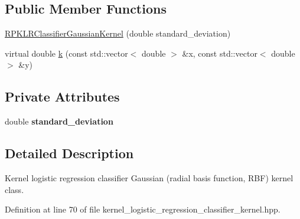 \subsection*{\-Public \-Member \-Functions}
\begin{DoxyCompactItemize}
\item 
\hyperlink{class_r_p_k_l_r_classifier_gaussian_kernel_aa2a4bd3a68b3a1ed6f53d56876891006}{\-R\-P\-K\-L\-R\-Classifier\-Gaussian\-Kernel} (double standard\-\_\-deviation)
\item 
virtual double \hyperlink{class_r_p_k_l_r_classifier_gaussian_kernel_aafa64c1a8d66ca122b3e5b2f0fb55acd}{k} (const std\-::vector$<$ double $>$ \&x, const std\-::vector$<$ double $>$ \&y)
\end{DoxyCompactItemize}
\subsection*{\-Private \-Attributes}
\begin{DoxyCompactItemize}
\item 
\hypertarget{class_r_p_k_l_r_classifier_gaussian_kernel_ab03f882cac61547c4c9c4dc71a4f9943}{double {\bfseries standard\-\_\-deviation}}\label{class_r_p_k_l_r_classifier_gaussian_kernel_ab03f882cac61547c4c9c4dc71a4f9943}

\end{DoxyCompactItemize}


\subsection{\-Detailed \-Description}
\-Kernel logistic regression classifier \-Gaussian (radial basis function, \-R\-B\-F) kernel class. 

\-Definition at line 70 of file kernel\-\_\-logistic\-\_\-regression\-\_\-classifier\-\_\-kernel.\-hpp.




